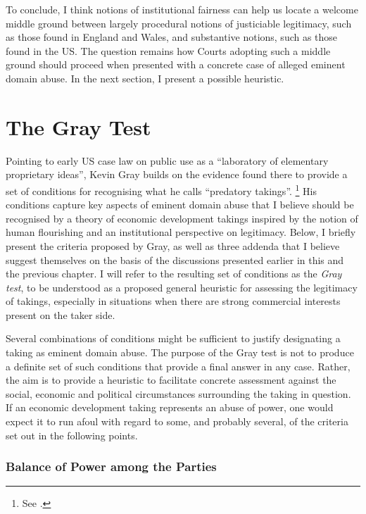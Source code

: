 To conclude, I think notions of institutional fairness can help us locate a welcome middle ground between largely procedural notions of justiciable legitimacy, such as those found in England and Wales, and substantive notions, such as those found in the US. The question remains how Courts adopting such a middle ground should proceed when presented with a concrete case of alleged eminent domain abuse. In the next section, I present a possible heuristic.

\section{The Gray Test}\label{sec:3:5}

Pointing to early US case law on public use as a ``laboratory of elementary proprietary ideas'', Kevin Gray builds on the evidence found there to provide a set of conditions for recognising what he calls ``predatory takings''. \footnote{See \cite[28-30]{gray11}.} His conditions capture key aspects of eminent domain abuse that I believe should be recognised by a theory of economic development takings inspired by the notion of human flourishing and an institutional perspective on legitimacy. Below, I briefly present the criteria proposed by Gray, as well as three addenda that I believe suggest themselves on the basis of the discussions presented earlier in this and the previous chapter. I will refer to the resulting set of conditions as the {\it Gray test}, to be understood as a proposed general heuristic for assessing the legitimacy of takings, especially in situations when there are strong commercial interests present on the taker side.

Several combinations of conditions might be sufficient to justify designating a taking as eminent domain abuse. The purpose of the Gray test is not to produce a definite set of such conditions that provide a final answer in any case. Rather, the aim is to provide a heuristic to facilitate concrete assessment against the social, economic and political circumstances surrounding the taking in question. If an economic development taking represents an abuse of power, one would expect it to run afoul with regard to some, and probably several, of the criteria set out in the following points.

\subsubsection*{Balance of Power among the Parties}

